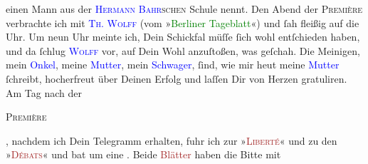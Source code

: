                einen Mann aus der \textsc{\textcolor{blue}{Hermann Bahr}{}\ledrightnote{\textcolor{blue}{Hermann Bahr}}schen} Schule nennt.\pend
           \pstart
           Den Abend der \textsc{Première} verbrachte ich mit \textsc{\textcolor{blue}{Th. Wolff}{}\ledrightnote{\textcolor{blue}{Theodor Wolff}}} (vom »\textcolor{green}{Berliner Tageblatt}{}\ledrightnote{\textcolor{green}{Berliner Tageblatt}}«) und ſah fleißig
               auf die Uhr. Um neun Uhr meinte ich, Dein Schickfal müſſe ſich wohl
               entſchieden haben, und da ſchlug \textsc{\textcolor{blue}{Wolff}{}\ledrightnote{\textcolor{blue}{Theodor Wolff}}} vor, auf Dein {\pb}Wohl anzuſtoßen, was
               geſchah.\pend
           \pstart
           Die Meinigen, mein \textcolor{blue}{Onkel}{},
               meine \textcolor{blue}{Mutter}{}, mein \textcolor{blue}{Schwager}{}, ſind, wie mir heut meine \textcolor{blue}{Mutter}{} ſchreibt, hocherfreut über Deinen Erfolg und laſſen
               Dir von Herzen gratuliren.\pend
           \pstart
           Am Tag nach der \begin{otherlanguage}{french}\textsc{Première}\end{otherlanguage}, nachdem ich Dein Telegramm erhalten, fuhr ich zur »\textsc{\textcolor{brown}{Liberté}{}\ledrightnote{\textcolor{brown}{La Liberté}}}« und zu den »\textsc{\textcolor{brown}{Débats}{}\ledrightnote{\textcolor{brown}{Journal des débats}}}« und bat um eine \label{K_L02751-4v}\label{K_L02751-4h}. Beide \textcolor{brown}{Blätter}{} haben die Bitte mit

